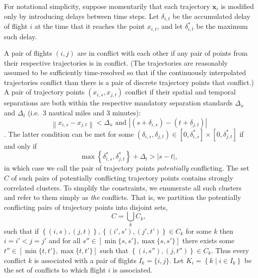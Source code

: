 For notational simplicity, suppose momentarily that each trajectory $\mathbf x_i$ is modified only by introducing delays between time steps.
Let $\delta_{i, t}$ be the accumulated delay of flight $i$ at the time that it reaches the point $x_{i, t}$, and let $\delta^*_{i, t}$ be the maximum such delay.

A pair of flights $(i, j)$ are in conflict with each other if any pair of points from their respective trajectories is in conflict.
(The trajectories are reasonably assumed to be sufficiently time-resolved so that if the continuously interpolated trajectories conflict than there is a pair of discrete trajectory points that conflict.)
A pair of trajectory points $(x_{i,s}, x_{j,t})$ conflict if their spatial and temporal separations are both within the respective mandatory separation standards $\Delta_x$ and $\Delta_t$ (i.e.\ $3$ nautical miles and $3$ minutes):
\begin{equation}
\left\|x_{i, s} - x_{j,t}\right\| < \Delta_x \text{ and } 
\left|\left(s + \delta_{i, s}\right) - \left(t + \delta_{j,t}\right)\right|
\end{equation}.
The latter condition can be met for some 
$\left(\delta_{i,s}, \delta_{j,t} \right) \in [0, \delta^*_{i,s}] \times [0, \delta^*_{j,t}]$ if and only if 
\begin{equation}
\max \left\{\delta^*_{i, s}, \delta^*_{j, t}\right\} + \Delta_t > |s - t|,
\end{equation}
in which case we call the pair of trajectory points \emph{potentially} conflicting.
The set $C$ of such pairs of potentially conflicting trajectory points contains strongly correlated clusters.
To simplify the constraints, we enumerate all such clusters and refer to them simply as \emph{the} conflicts.
That is, we partition the potentially conflicting pairs of trajectory points into disjoint sets,
\begin{equation}
C =  \bigcup_{k} C_k,
\end{equation}
such that if $\left\{(i, s), (j, t)\right\}, \left\{(i', s'), (j', t')\right\} \in C_k$ for some $k$ then
$i = i' < j = j'$ and for all 
$s'' \in [\min \{s, s'\}, \max\{s, s'\}]$
there exists some 
${t'' \in [\min \{t, t'\}, \max\{t, t'\}]}$
such that
${\left\{(i, s''), (j, t'')\right\} \in C_k}$.
Thus every conflict $k$ is associated with a pair of flights $I_k = \{i, j\}$.
Let $K_i = \left\{k \middle| i \in I_k \right\}$ be the set of conflicts to which flight $i$ is associated.

